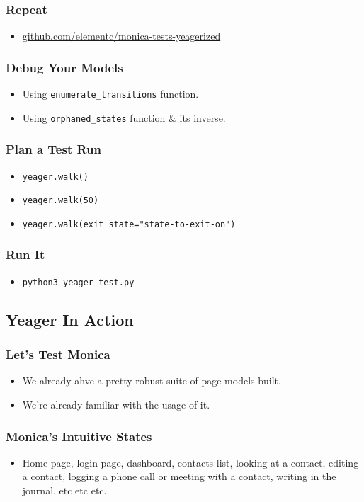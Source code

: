 \begin{frame}
  \frametitle{Repeat}
  \begin{itemize}
    \item \url{github.com/elementc/monica-tests-yeagerized}
  \end{itemize}
\end{frame}

\begin{frame}
  \frametitle{Debug Your Models}
  \begin{itemize}
    \item Using \texttt{enumerate\_transitions} function.
    \item Using \texttt{orphaned\_states} function \& its inverse.
  \end{itemize}
\end{frame}

\begin{frame}
  \frametitle{Plan a Test Run}
  \begin{itemize}
    \item \texttt{yeager.walk()}
    \item \texttt{yeager.walk(50)}
    \item \texttt{yeager.walk(exit\_state="state-to-exit-on")}
  \end{itemize}
\end{frame}

\begin{frame}
  \frametitle{Run It}
  \begin{itemize}
    \item \texttt{python3 yeager\_test.py}
  \end{itemize}
\end{frame}

\subsection{Yeager In Action}

\begin{frame}
  \frametitle{Let's Test Monica}
  \begin{itemize}
    \item We already ahve a pretty robust suite of page models built.
    \item We're already familiar with the usage of it.
  \end{itemize}
\end{frame}

\begin{frame}
  \frametitle{Monica's Intuitive States}
  \begin{itemize}
    \item Home page, login page, dashboard, contacts list, looking at a contact, editing a contact, logging a phone call or meeting with a contact, writing in the journal, etc etc etc.
  \end{itemize}
\end{frame}

